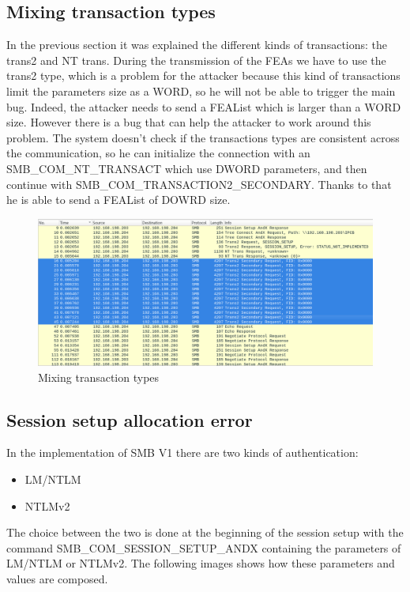 \clearpage

\subsection{Mixing transaction types}
In the previous section it was explained the different kinds of transactions: the trans2 and NT trans.
During the transmission of the FEAs we have to use the trans2 type, which is a problem for the attacker because this kind of transactions limit
the parameters size as a WORD, so he will not be able to trigger the main bug. Indeed, the attacker needs to send a FEAList which is larger than a 
WORD size.
However there is a bug that can help the attacker to work around this problem. The system doesn't check if the transactions types are 
consistent across the communication, so he can initialize the connection with an SMB\_COM\_NT\_TRANSACT which use DWORD parameters, and then continue with SMB\_COM\_TRANSACTION2\_SECONDARY.
Thanks to that he is able to send a FEAList of DOWRD size.
\begin{figure}[ht!]
  \centering
    \includegraphics[scale=0.35]{images/ws_trans2_requests.png}
    \caption{Mixing transaction types}
\end{figure}

\clearpage

\subsection{Session setup allocation error}
In the implementation of SMB V1 there are two kinds of authentication\cite{eternalblue-analysis}:
\begin{itemize}
  \item LM/NTLM
  \item NTLMv2
\end{itemize}
The choice between the two is done at the beginning of the session setup with the command
SMB\_COM\_SESSION\_SETUP\_ANDX containing the parameters of LM/NTLM or NTLMv2.
The following images shows how these parameters and values are composed.


